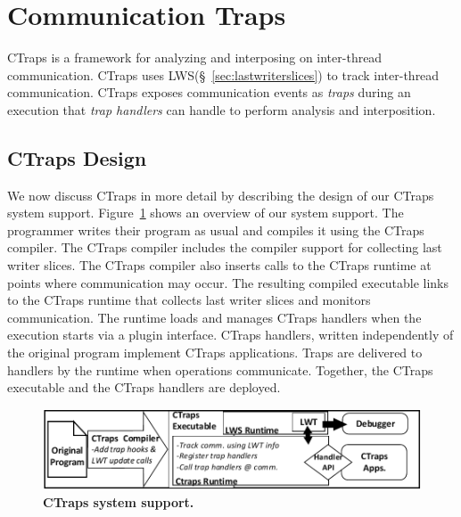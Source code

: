\documentclass[10pt,nocopyrightspace]{sigplanconf}
\newcommand{\ctraps}{CTraps\xspace}
\newcommand{\lws}{LWS\xspace}
\newcommand{\Caption}[1]{\begin{minipage}{.95\columnwidth} \caption{#1} \end{minipage} \vspace{-1.2ex}}
\begin{document}
\section{Communication Traps}
\label{sec:ctraps}

\ctraps is a framework for analyzing and interposing on inter-thread
communication.  \ctraps uses \lws (\S~\ref{sec:lastwriterslices}) to track
inter-thread communication.  \ctraps exposes communication events as {\em
traps} during an execution that {\em trap handlers} can handle to perform
analysis and interposition.  

\subsection{\ctraps Design}

We now discuss \ctraps in more detail by describing the design of our \ctraps
system support.  Figure~\ref{fig:systemdiagram} shows an overview of our system
support.  The programmer writes their program as usual and compiles it using
the \ctraps compiler. The \ctraps compiler includes the compiler support for
collecting last writer slices.  The \ctraps compiler also inserts
calls to the \ctraps runtime at points where communication may occur.  The
resulting compiled executable links to the \ctraps runtime that collects last
writer slices and monitors communication.  The runtime loads and manages \ctraps
handlers when the execution starts via a plugin interface.  \ctraps handlers,
written independently of the original program implement \ctraps applications.
Traps are delivered to handlers by the runtime when operations communicate.
Together, the \ctraps executable and the \ctraps handlers are deployed.


\begin{figure}[htb]
\centering
\includegraphics[width=.90\columnwidth]{figs/CTraps_Overview.pdf}
\Caption{\label{fig:systemdiagram}{\bf CTraps system support.}}
\end{figure}


\end{document}
